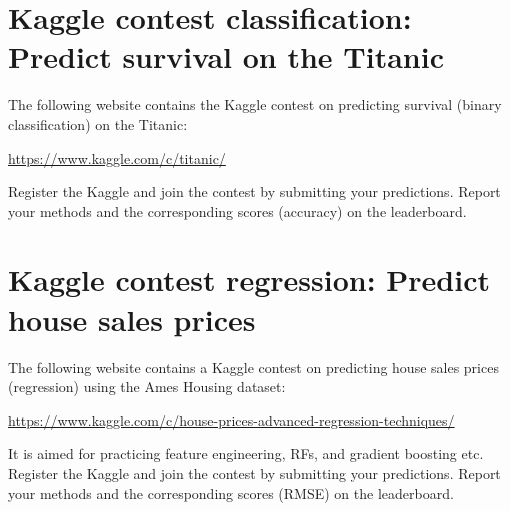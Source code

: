 \documentclass[11pt]{article}
\begin{document}
\section{Kaggle contest classification: Predict survival on the Titanic}
The following website contains the Kaggle contest on predicting survival (binary classification) on the Titanic: 

\url{https://www.kaggle.com/c/titanic/}

\noindent Register the Kaggle and join the contest by submitting your predictions. Report your methods and the corresponding scores (accuracy) on the leaderboard. 

\section{Kaggle contest regression: Predict house sales prices}
The following website contains a Kaggle contest on predicting house sales prices (regression) using the Ames Housing dataset: 

\url{https://www.kaggle.com/c/house-prices-advanced-regression-techniques/}

It is aimed for practicing feature engineering, RFs, and gradient boosting etc. Register the Kaggle and join the contest by submitting your predictions. Report your methods and the corresponding scores (RMSE) on the leaderboard.


%
%
\end{document}
